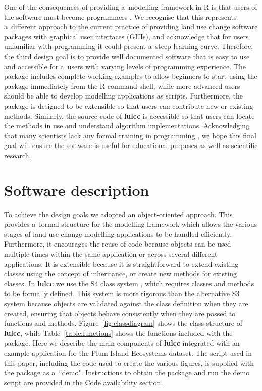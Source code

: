 \documentclass{icldt}\usepackage[]{graphicx}\usepackage[]{color}
\begin{document}
One of the consequences of providing a~modelling framework in R is that users of the software must become programmers \citep{chambers2000}. We recognise that this represents a~different approach to the current practice of providing land use change software packages with graphical user interfaces (GUIs), and acknowledge that for users unfamiliar with programming it could present a~steep learning curve. Therefore, the third design goal is to provide well documented software that is easy to use and accessible for a~users with varying levels of programming experience. The package includes complete working examples to allow beginners to start using the package immediately from the R command shell, while more advanced users should be able to develop modelling applications as scripts. Furthermore, the package is designed to be extensible so that users can contribute new or existing methods. Similarly, the source code of \textbf{lulcc} is accessible so that users can locate the methods in use and understand algorithm implementations. Acknowledging that many scientists lack any formal training in programming \citep{joppa2013,wilson2014}, we hope this final goal will ensure the software is useful for educational purposes as well as scientific research. \\

\section{Software description}

To achieve the design goals we adopted an object-oriented approach. This provides a~formal structure for the modelling framework which allows the various stages of land use change modelling applications to be handled efficiently. Furthermore, it encourages the reuse of code because objects can be used multiple times within the same application or across several different applications. It is extensible because it is straightforward to extend existing classes using the concept of inheritance, or create new methods for existing classes. In \textbf{lulcc} we use the S4 class system \citep{chambers1998,chambers2008}, which requires classes and methods to be formally defined. This system is more rigorous than the alternative S3 system because objects are validated against the class definition when they are created, ensuring that objects behave consistently when they are passed to functions and methods. Figure~\ref{fig:classdiagram} shows the class structure of \textbf{lulcc}, while Table~\ref{table:functions} shows the functions included with the package. Here we describe the main components of \textbf{lulcc} integrated with an example application for the Plum Island Ecosystems dataset. The script used in this paper, including the code used to create the various figures, is supplied with the package as a~``demo". Instructions to obtain the package and run the demo script are provided in the Code availability section. \\
\end{document}
